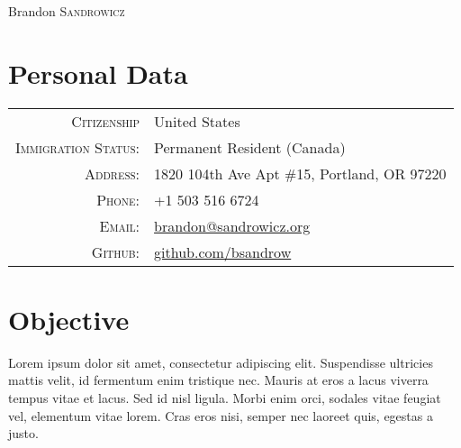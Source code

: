 \documentclass[a4paper,10pt]{article}
\begin{document}
\pagestyle{empty} %

\par{\centering
    {\Huge Brandon \textsc{Sandrowicz} }
    \bigskip\par}

\section{Personal Data}
\begin{tabular}{rl}
\textsc{Citizenship}                    & United States\\
\textsc{Immigration Status:}            & Permanent Resident (Canada)\\
\textsc{Address:}                       & 1820 104th Ave Apt \#15, Portland, OR 97220\\
\textsc{Phone:}                         & +1 503 516 6724\\
\textsc{Email:}                         & \href{mailto:brandon@sandrowicz.org}{brandon@sandrowicz.org}\\
\textsc{Github:}                        & \href{http://github.com/bsandrow}{github.com/bsandrow}\\
\end{tabular}

\section{Objective}
Lorem ipsum dolor sit amet, consectetur adipiscing elit. Suspendisse ultricies
mattis velit, id fermentum enim tristique nec. Mauris at eros a lacus viverra
tempus vitae et lacus. Sed id nisl ligula. Morbi enim orci, sodales vitae
feugiat vel, elementum vitae lorem. Cras eros nisi, semper nec laoreet quis,
egestas a justo.

\end{document}
